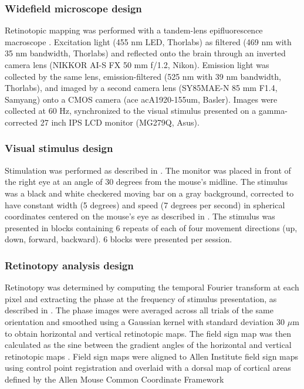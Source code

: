 \subsubsection{Widefield microscope design}
Retinotopic mapping was performed with a tandem-lens epifluorescence macroscope \citep{Ratzlaff1991}. Excitation light (455 nm LED, Thorlabs) as filtered (469 nm with 35 nm bandwidth, Thorlabs) and reflected onto the brain through an inverted camera lens (NIKKOR AI-S FX 50 mm f/1.2, Nikon). Emission light was collected by the same lens, emission-filtered (525 nm with 39 nm bandwidth, Thorlabs), and imaged by a second camera lens (SY85MAE-N 85 mm F1.4, Samyang) onto a CMOS camera (ace acA1920-155um, Basler). Images were collected at 60 Hz, synchronized to the visual stimulus presented on a gamma-corrected 27 inch IPS LCD monitor (MG279Q, Asus). 

\subsubsection{Visual stimulus design}
Stimulation was performed as described in \citep{Marshel2011}. The monitor was placed in front of the right eye at an angle of 30 degrees from the mouse's midline. The stimulus was a black and white checkered moving bar on a gray background, corrected to have constant width (5 degrees) and speed (7 degrees per second) in spherical coordinates centered on the mouse's eye as described in \citep{Marshel2011}. The stimulus was presented in blocks containing 6 repeats of each of four movement directions (up, down, forward, backward). 6 blocks were presented per session. 

\subsubsection{Retinotopy analysis design}
Retinotopy was determined by computing the temporal Fourier transform at each pixel and extracting the phase at the frequency of stimulus presentation, as described in \citep{Kalatsky2003}. The phase images were averaged across all trials of the same orientation and smoothed using a Gaussian kernel with standard deviation 30 $\mu$m to obtain horizontal and vertical retinotopic maps. The field sign map was then calculated as the sine between the gradient angles of the horizontal and vertical retinotopic maps \citep{Garrett2014}. Field sign maps were aligned to Allen Institute field sign maps using control point registration and overlaid with a dorsal map of cortical areas defined by the Allen Mouse Common Coordinate Framework \citep{CCF2015}


